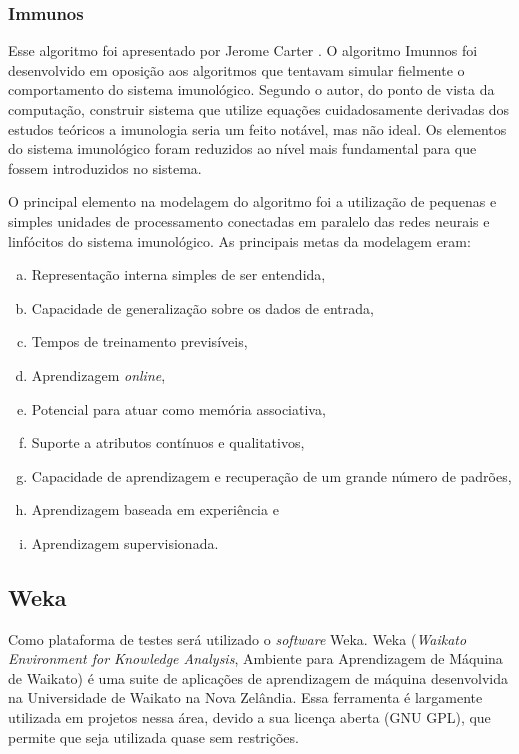 \subsubsection{Immunos}
\label{sec:prop_immunos}

Esse algoritmo foi apresentado por Jerome Carter \cite{Carter2000}. O algoritmo Imunnos foi desenvolvido em oposição aos algoritmos que tentavam simular fielmente o comportamento do sistema imunológico. Segundo o autor, do ponto de vista da computação, construir sistema que utilize equações cuidadosamente derivadas dos estudos teóricos a imunologia seria um feito notável, mas não ideal. Os elementos do sistema imunológico foram reduzidos ao nível mais fundamental para que fossem introduzidos no sistema.

O principal elemento na modelagem do algoritmo foi a utilização de pequenas e simples unidades de processamento conectadas em paralelo das redes neurais e linfócitos do sistema imunológico. As principais metas da modelagem eram:

\vspace{2mm}
\begin{enumerate}[a)]
    \itemsep1pt
    \item Representação interna simples de ser entendida,
    \item Capacidade de generalização sobre os dados de entrada,
    \item Tempos de treinamento previsíveis,
    \item Aprendizagem \emph{online},
    \item Potencial para atuar como memória associativa,
    \item Suporte a atributos contínuos e qualitativos,
    \item Capacidade de aprendizagem e recuperação de um grande número de padrões,
    \item Aprendizagem baseada em experiência e
    \item Aprendizagem supervisionada.
\end{enumerate}
\vspace{2mm}

\subsection{Weka}{}
\label{sec:prop_weka}

Como plataforma de testes será utilizado o \emph{software} Weka. Weka (\emph{Waikato Environment for Knowledge Analysis}, Ambiente para Aprendizagem de Máquina de Waikato) é uma suite de aplicações de aprendizagem de máquina desenvolvida na Universidade de Waikato na Nova Zelândia. Essa ferramenta é largamente utilizada em projetos nessa área, devido a sua licença aberta (GNU GPL), que permite que seja utilizada quase sem restrições.

